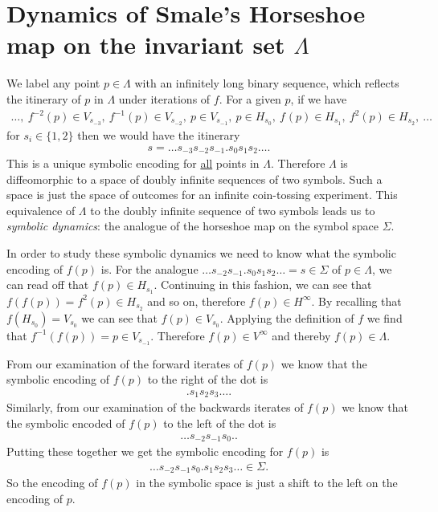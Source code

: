 \section{Dynamics of Smale's Horseshoe map on the invariant set $\Lambda$}
We label any point $p\in \Lambda$ with an infinitely long binary sequence, which reflects the itinerary of $p$ in $\Lambda$ under iterations of $f$. For a given $p$, if we have 
\begin{align}
	\ldots,\
	f^{-2}(p) \in V_{s_{-3}},\
	f^{-1}(p) \in V_{s_{-2}},\
	p \in V_{s_{-1}},\
	p \in H_{s_{0}},\
	f^{}(p) \in H_{s_{1}},\
	f^{2}(p) \in H_{s_{2}},\
\ldots	
\end{align}
for $s_i\in \{1,2\}$ then we would have the itinerary 
\begin{align}
	\boxed{
s  = \ldots s_{-3}s_{-2}s_{-1} \bm{.}  s_0 s_{1}s_{2}\ldots.
	}
\end{align}
This is a unique symbolic encoding for \underline{all} points in $\Lambda$. Therefore $\Lambda$ is diffeomorphic to a space of doubly infinite sequences of two symbols. Such a space is just the space of outcomes for an infinite coin-tossing experiment. This equivalence of $\Lambda$ to the doubly infinite sequence of two symbols leads us to \emph{symbolic dynamics}: the analogue of the horseshoe map on the symbol space $\Sigma$.

In order to study these symbolic dynamics we need to know what the symbolic encoding of $f(p)$ is. For the analogue $\ldots s_{-2}s_{-1}\bm{.} s_0 s_1 s_2 \ldots = s\in \Sigma$ of $p\in \Lambda $, we can read off that $f(p)\in H_{s_1}$. Continuing in this fashion, we can see that $f(f(p))=f^{2}(p) \in H_{s_2}$ and so on, therefore $f(p)\in H^{\infty }$. By recalling that $f(H_{s_0}) = V_{s_0}$ we can see that $f(p) \in V_{s_0}$. Applying the definition of $f$ we find that $f^{-1}(f(p)) = p \in V_{s_{-1}}$. Therefore $f(p)\in V^{\infty }$ and thereby $f(p) \in \Lambda$. 

From our examination of the forward iterates of $f(p)$ we know that the symbolic encoding of $f(p)$ to the right of the dot is
\begin{align}
	\bm{.}s_1 s_2 s_3\ldots. 
\end{align}
Similarly, from our examination of the backwards iterates of $f(p)$ we know that the symbolic encoded of $f(p)$ to the left of the dot is
\begin{align}
\ldots s_{-2} s_{-1} s_{0} \bm{.}. 
\end{align}
Putting these together we get the symbolic encoding for $f(p)$ is 
\begin{align}
	\ldots s_{-2} s_{-1} s_{0} \bm{.} s_1 s_2 s_3 \ldots \in \Sigma.
\end{align}
So the encoding of $f(p)$ in the symbolic space is just a shift to the left on the encoding of $p$.

